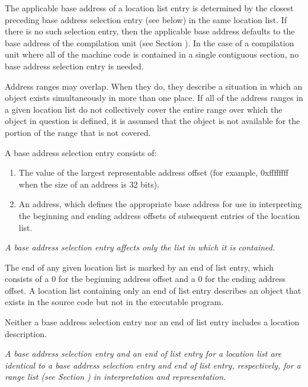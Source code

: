 The applicable base address of a location list entry is
determined by the closest preceding base address selection
entry (see below) in the same location list. If there is
no such selection entry, then the applicable base address
defaults to the base address of the compilation unit (see
Section ).  
In the case of a compilation unit where all of
the machine code is contained in a single contiguous section,
no base address selection entry is needed.

Address ranges may overlap. When they do, they describe a
situation in which an object exists simultaneously in more than
one place. If all of the address ranges in a given location
list do not collectively cover the entire range over which the
object in question is defined, it is assumed that the object is
not available for the portion of the range that is not covered.

A base address selection entry consists of:
\begin{enumerate}[1]
\item The value of the largest representable 
address offset (for example, 0xffffffff when the size of
an address is 32 bits).
\item An address, which defines the 
appropriate base address for use in interpreting the beginning
and ending address offsets of subsequent entries of the location list.
\end{enumerate}


\textit{A base address selection entry 
affects only the list in which it is contained.}

The end of any given location list is marked by an end of
list entry, which consists of a 0 for the beginning address
offset and a 0 for the ending address offset. A location list
containing only an end of list entry describes an object that
exists in the source code but not in the executable program.

Neither a base address selection entry nor an end of list
entry includes a location description.

\textit{A base address selection entry and an end of list
entry for a location list are identical to a base address
selection entry and end of list entry, respectively, for a
range list 
(see Section ) 
in interpretation
and representation.}






